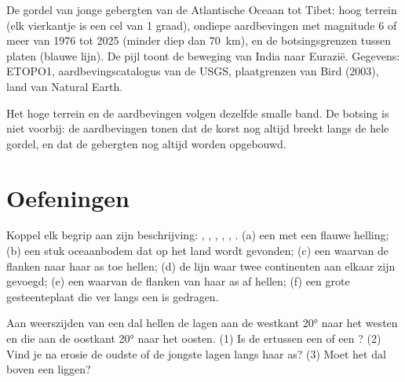 \begin{omfigure}
{\small De gordel van jonge gebergten van de Atlantische Oceaan tot Tibet: hoog terrein
(elk vierkantje is een cel van 1 graad), ondiepe aardbevingen met magnitude 6 of meer
van 1976 tot 2025 (minder diep dan \qty{70}{km}), en de
botsingsgrenzen tussen platen (blauwe lijn). De pijl toont de beweging van India
naar Eurazië. Gegevens: ETOPO1, aardbevingscatalogus van de USGS, plaatgrenzen van
Bird (2003), land van Natural Earth.}
\end{omfigure}

Het hoge terrein en de aardbevingen volgen dezelfde smalle band. De
botsing is niet voorbij: de aardbevingen tonen dat de korst nog altijd breekt
langs de hele gordel, en dat de gebergten nog altijd worden opgebouwd.

\section{Oefeningen}

\begin{exercise}[$\star$]\label{exo:g12:mountain-building:1}
Koppel elk begrip aan zijn beschrijving: , , , ,
, . (a) een  met een flauwe helling; (b) een stuk
oceaanbodem dat op het land wordt gevonden; (c) een  waarvan de flanken naar haar as toe hellen;
(d) de lijn waar twee continenten aan elkaar zijn gevoegd; (e) een  waarvan de flanken
van haar as af hellen; (f) een grote gesteenteplaat die ver langs een  is gedragen.
\end{exercise}

\begin{exercise}[$\star$]\label{exo:g12:mountain-building:2}
Aan weerszijden van een dal hellen de lagen aan de westkant \ang{20} naar het westen en
die aan de oostkant \ang{20} naar het oosten. (1) Is de  ertussen
een  of een ? (2) Vind je na erosie de oudste of de jongste
lagen langs haar as? (3) Moet het dal boven een  liggen?
\end{exercise}

